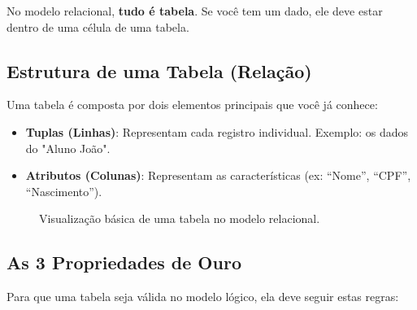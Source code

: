 No modelo relacional, \textbf{tudo é tabela}. Se você tem um dado, ele deve estar dentro de uma célula de uma tabela.

\subsection{Estrutura de uma Tabela (Relação)}

Uma tabela é composta por dois elementos principais que você já conhece:
\begin{itemize}
    \item \textbf{Tuplas (Linhas)}: Representam cada registro individual. Exemplo: os dados do "Aluno João".
    \item \textbf{Atributos (Colunas)}: Representam as características (ex: ``Nome'', ``CPF'', ``Nascimento'').
\end{itemize}

\begin{figure}[H]
    \centering
    \caption{Visualização básica de uma tabela no modelo relacional.}
\end{figure}

\subsection{As 3 Propriedades de Ouro}

Para que uma tabela seja válida no modelo lógico, ela deve seguir estas regras:


